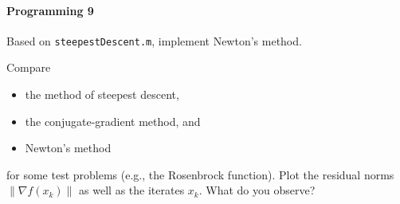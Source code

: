 \paragraph{Programming 9}
Based on \texttt{steepestDescent.m}, implement Newton's method.

Compare
\begin{itemize}
  \item the method of steepest descent,
  \item the conjugate-gradient method, and
  \item Newton's method
\end{itemize}
for some test problems (e.g., the Rosenbrock function). Plot the residual
norms $\|\nabla f(x_k)\|$ as well as the iterates $x_k$. What do you observe?


